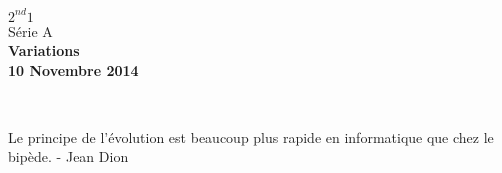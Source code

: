 \documentclass[10pt]{article}
\begin{document}

\begin{minipage}[t]{\textwidth}
  \raggedright
      {\bfseries $2^{nd}1$}\\[.35ex]
      Série A\\
      \vspace*{-1cm}
      \raggedleft
          {\bfseries Variations}\\[.35ex]
          {\bfseries 10 Novembre 2014}\\[.35ex]
\end{minipage}\\[1em]

\begin{center}
  \textsf{Le principe de l'évolution est beaucoup plus rapide en informatique que chez le bipède. - Jean Dion}\\
\end{center}

\setlength{\columnseprule}{1pt}
\end{document}
